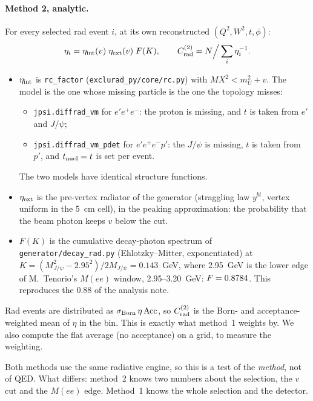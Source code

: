 \documentclass[11pt]{article}
\newcommand{\crad}{C_{\rm rad}}
\begin{document}
\paragraph{Method 2, analytic.} For every selected rad event $i$, at its own reconstructed $(Q^2,W^2,t,\phi)$:
\begin{equation}
\eta_i = \eta_{\rm int}(v)\;\eta_{\rm ext}(v)\;F(K), \qquad
\crad^{(2)} = N\Big/\sum_i \eta_i^{-1}.
\end{equation}
\begin{itemize}
\item $\eta_{\rm int}$ is \texttt{rc\_factor} (\texttt{exclurad\_py/core/rc.py}) with $MX^2<m_U^2+v$. The model is the one whose missing
particle is the one the topology misses:
\begin{itemize}
\item \texttt{jpsi.diffrad\_vm} for $e'e^+e^-$: the proton is missing, and $t$ is taken from $e'$ and $J/\psi$;
\item \texttt{jpsi.diffrad\_vm\_pdet} for $e'e^+e^-p'$: the $J/\psi$ is missing, $t$ is taken from $p'$, and $t_{\rm nucl}=t$ is set per event.
\end{itemize}
The two models have identical structure functions.
\item $\eta_{\rm ext}$ is the pre-vertex radiator of the generator (straggling law $y^{bt}$, vertex uniform in the 5~cm cell), in the
peaking approximation: the probability that the beam photon keeps $v$ below the cut.
\item $F(K)$ is the cumulative decay-photon spectrum of \texttt{generator/decay\_rad.py} (Ehlotzky--Mitter, exponentiated) at
$K=(M_{J/\psi}^2-2.95^2)/2M_{J/\psi}=0.143$~GeV, where 2.95~GeV is the lower edge of M.~Tenorio's $M(ee)$ window, 2.95--3.20~GeV: $F=0.8784$. This reproduces the $0.88$ of the analysis note.
\end{itemize}
Rad events are distributed as $\sigma_{\rm Born}\,\eta\,{\rm Acc}$, so $\crad^{(2)}$ is the Born- and
acceptance-weighted mean of $\eta$ in the bin. This is exactly what method~1 weights by. We also compute the flat average
(no acceptance) on a grid, to measure the weighting.

Both methods use the same radiative engine, so this is a test of the \emph{method}, not of QED. What differs: method~2 knows two
numbers about the selection, the $v$ cut and the $M(ee)$ edge. Method~1 knows the whole selection and the detector.

\end{document}
